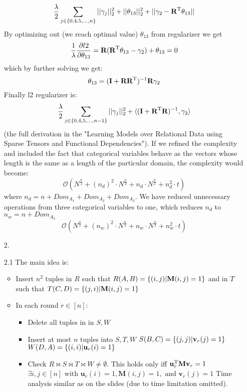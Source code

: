 \documentclass[10pt,a4paper]{article}
\begin{document}
\begin{enumerate}
$$\frac{\lambda}{2} \sum_{j \in \{0, 4, 5, ..., n \} } ||\gamma_j||_2^2 + ||\theta_{13} ||^2_2 +  ||\gamma_2 - \textbf{\text{{R}}} ^ \text{T}\theta_{13}  ||$$
By optimizing out (we reach optimal value) $\theta_{13}$ from regularizer we get 
$$\frac{1}{\lambda} \frac{\partial l2}{\partial \theta_{13}} =\textbf{\text{{R}}}(\textbf{\text{{R}}} ^ \text{T}\theta_{13} - \gamma_2) + \theta_{13} =0$$
which by further solving we get:
$$\theta_{13} = (\textbf{\text{{I}}} + \textbf{\text{{R}}}\textbf{\text{{R}}} ^ \text{T})^{-1}\textbf{\text{{R}}}\gamma_2$$
Finally l2 regularizer is:
$$\frac{\lambda}{2} \sum_{j \in \{0, 4, 5, ..., n-1 \} } ||\gamma_j||_2^2 + \langle (\textbf{\text{{I}}} + \textbf{\text{{R}}} ^ \text{T}\textbf{\text{{R}}})^{-1}, \gamma_2 \rangle $$ (the full derivation in the "Learning Models over Relational Data
using Sparse Tensors and Functional Dependencies").
If we refined the complexity and included the fact that categorical variables behave as the vectors whose length is the same as a length of the particular domain, the complexity would become:
$$\mathcal{O}(N^\frac{n}{2} + (n_d)^2 \cdot N^\frac{n}{2} + n_d \cdot  N^\frac{n}{2} + n_d^2 \cdot t) $$
where $n_d= n + Dom_{A_1}+Dom_{A_2} + Dom_{A_3}$.
We have reduced unnecessary operations from three categorical variables to one, which reduces $n_d$ to $n_w = n + Dom_{A_2}$
$$\mathcal{O}(N^\frac{n}{2} + (n_w)^2 \cdot N^\frac{n}{2} + n_w \cdot  N^\frac{n}{2} + n_w^2 \cdot t) $$
\item[2.]
\item[2.1]
The main idea is:
\begin{itemize}
\item 
Insert $n^2$ tuples in $R$ such that $R(A, B) = \{(i, j) | \textbf{\text{{M}}}(i, j) = 1\}$ and in $T$ such that $T(C, D) = \{(j, i) | \textbf{\text{{M}}}(i, j) = 1\}$ 
\item In each round $r \in [n]$:
\begin{itemize}
\item Delete all tuples in in $S, W$
\item Insert at most $n$ tuples into $S, T, W$ 
$S(B, C) = \{(j, j) | \textbf{\text{{v}}}_r(j) = 1\}$
$W(D, A) = \{(i, i) | \textbf{\text{{u}}}_r(i) = 1\}$
\item Check $R \bowtie S \bowtie T \bowtie W \neq \emptyset$. This holds only iff $\textbf{\text{{u}}} ^ \text{T}_r\textbf{\text{{M}}}\textbf{\text{{v}}}_r=1$
$
\exists i, j \in[n] \text { with } \mathbf{u}_{r}(i)=1, \mathbf{M}(i, j)=1, \text { and } \mathbf{v}_{r}(j)=1
$
Time analysis similar as on the slides (due to time limitation omitted). 


\end{itemize}
\end{itemize}

\end{enumerate}
\end{document}
